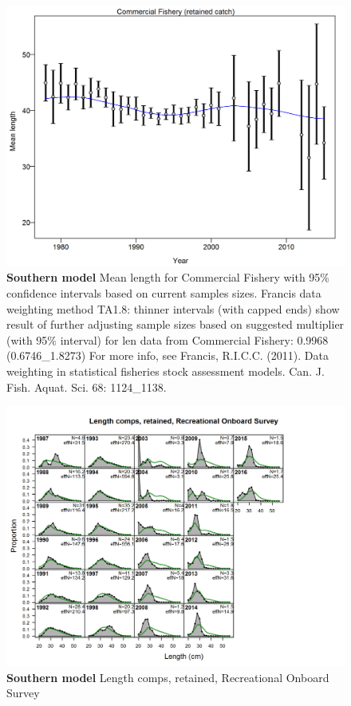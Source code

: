 \documentclass[12pt,]{article}
\begin{document}
\begin{figure}[htbp]
\centering
\includegraphics{./tex2pdf.8516/d38d56c0bf17a7d7767ba6eeb470a03c15ba755c.png}
\caption{\textbf{Southern model} Mean length for Commercial Fishery with
95\% confidence intervals based on current samples sizes. Francis data
weighting method TA1.8: thinner intervals (with capped ends) show result
of further adjusting sample sizes based on suggested multiplier (with
95\% interval) for len data from Commercial Fishery: 0.9968
(0.6746\_1.8273) For more info, see Francis, R.I.C.C. (2011). Data
weighting in statistical fisheries stock assessment models. Can. J.
Fish. Aquat. Sci. 68: 1124\_1138.
\label{fig:mod2_8_comp_lenfit_data_weighting_TA1.8_Commercial Fishery}}
\end{figure}

\begin{figure}[htbp]
\centering
\includegraphics{./r4ss/plots_mod2/comp_lenfit_flt3mkt2.png}
\caption{\textbf{Southern model} Length comps, retained, Recreational
Onboard Survey \label{fig:mod2_9_comp_lenfit_flt3mkt2}}
\end{figure}
\end{document}
